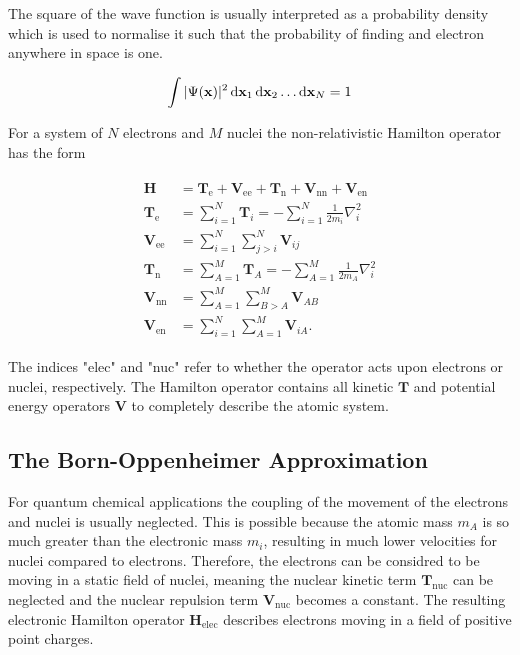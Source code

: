 The square of the wave function is usually interpreted as a probability density
which is used to normalise it such that the probability of finding and electron
anywhere in space is one.

\begin{align}
    \int |\Psi(\mathbf{x})|^2\dif \mathbf{x}_1\dif \mathbf{x}_2\ldots\dif \mathbf{x}_N=1
\end{align}



For a system of $N$ electrons and $M$ nuclei the non-relativistic
Hamilton operator has the form

\begin{align}
\begin{aligned}
    \mathbf{H}&=\mathbf{T}_\text{e} + \mathbf{V}_\text{ee} + \mathbf{T}_\text{n} + \mathbf{V}_\text{nn} + \mathbf{V}_\text{en} \\
    \mathbf{T}_\text{e}&=\sum_{i=1}^N\mathbf{T}_i=-\sum_{i=1}^N\frac{1}{2m_i}\nabla_i^2 \\
    \mathbf{V}_\text{ee}&=\sum_{i=1}^N\sum_{j>i}^N\mathbf{V}_{ij} \\
    \mathbf{T}_\text{n}&=\sum_{A=1}^M\mathbf{T}_A=-\sum_{A=1}^M\frac{1}{2m_A}\nabla_i^2 \\
    \mathbf{V}_\text{nn}&=\sum_{A=1}^M\sum_{B>A}^M\mathbf{V}_{AB} \\
    \mathbf{V}_\text{en}&=\sum_{i=1}^N\sum_{A=1}^M\mathbf{V}_{iA}.\label{eqn:hamiltonoperator}
\end{aligned}
\end{align}

The indices "elec" and "nuc" refer to whether the operator acts upon electrons
or nuclei, respectively. The Hamilton operator contains all kinetic
$\mathbf{T}$ and potential energy operators $\mathbf{V}$ to completely describe
the atomic system.

\subsection{The Born-Oppenheimer Approximation}

For quantum chemical applications the coupling of the movement of the electrons
and nuclei is usually neglected. This is possible because the atomic mass $m_A$
is so much greater than the electronic mass $m_i$, resulting in much lower
velocities for nuclei compared to electrons. Therefore, the electrons can be
considred to be moving in a static field of nuclei, meaning the nuclear kinetic
term $\mathbf{T}_\text{nuc}$ can be neglected and the nuclear repulsion term
$\mathbf{V}_\text{nuc}$ becomes a constant. The resulting electronic Hamilton
operator $\mathbf{H}_\text{elec}$ describes electrons moving in a field of
positive point charges.

